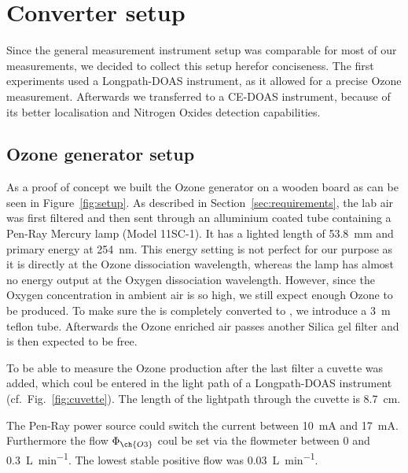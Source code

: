 \section{Converter setup}
\label{sec:setup}

Since the general measurement instrument setup was comparable for most
of our measurements, we decided to collect this setup herefor
conciseness. The first experiments used a Longpath-DOAS instrument, as
it allowed for a precise Ozone measurement. Afterwards we transferred
to a CE-DOAS instrument, because of its better localisation and
Nitrogen Oxides detection capabilities.

\subsection{Ozone generator setup}
\label{sec:ozone-setup}

As a proof of concept we built the Ozone generator on a wooden board
as can be seen in Figure~\ref{fig:setup}. As described in
Section~\ref{sec:requirements}, the lab air was first filtered and
then sent through an alluminium coated tube containing a Pen-Ray
Mercury lamp (Model 11SC-1). It has a lighted length of
\SI{53.8}{\milli\meter} and primary energy at
\SI{254}{\nano\meter}. This energy setting is not perfect for
our purpose as it is directly at the Ozone dissociation wavelength,
whereas the lamp has almost no energy output at the Oxygen
dissociation wavelength. However, since the Oxygen concentration in
ambient air is so high, we still expect enough Ozone to be
produced. 
To make sure the  is completely converted to
, we introduce a \SI{3}{\meter} teflon tube. Afterwards the
Ozone enriched air passes another Silica gel filter and is then
expected to be  free.

To be able to measure the Ozone production after the last filter a
cuvette was added, which coul be entered in the light path of a
Longpath-DOAS instrument (cf.\ Fig.~\ref{fig:cuvette}). The length of
the lightpath through the cuvette is \SI{8.7}{\centi\meter}. 

The Pen-Ray power source could switch the current between
\SI{10}{\milli\ampere} and \SI{17}{\milli\ampere}.  Furthermore the
flow $\Phi_{\ch{O 3}}$ coul be set via the flowmeter between \num{0}
and \SI{0.3}{\liter\per\minute}. The lowest stable positive flow was
\SI{0.03}{\liter\per\minute}. 

